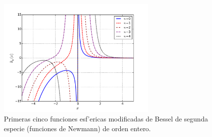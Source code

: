 %
\begin{figure}[H]
\centering
\includegraphics[angle=0,width=0.7\textwidth]{figs/fig-Bessel-Esferica-k.pdf}
\caption{Primeras cinco funciones esf'ericas modificadas de Bessel de segunda especie (funciones de Newmann) de orden entero.}
\label{fig-kn}
\end{figure}